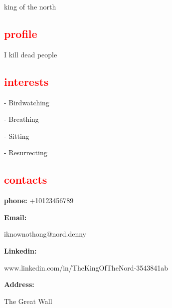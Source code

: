\documentclass{my_cv}
\begin{document}
\textcolor{red}{\textsf{}}

\begin{tcolorbox}[colframe=white,colback=red!75!green!50,arc=0pt]
king of the north


\end{tcolorbox}

\begin{minipage}{0.30\textwidth}


   \textcolor{red}{\section{profile}} 
    I kill dead people
    \textcolor{red}{\section{interests}} 
    
    - Birdwatching

    - Breathing
    
    - Sitting
    
    - Resurrecting
    
    \textcolor{red}{\section{contacts}}
    
    \textbf{phone:} +10123456789
    
    \textbf{Email:}
    
    iknownothong@nord.denny
    
    
    \textbf{Linkedin:} 

    www.linkedin.com/in/TheKingOfTheNord-3543841ab
   \
    
    \textbf{Address:}
    
    The Great Wall 
    
\end{minipage} 
\hspace{1cm}\vrule \hspace{1cm} %
\end{document}
